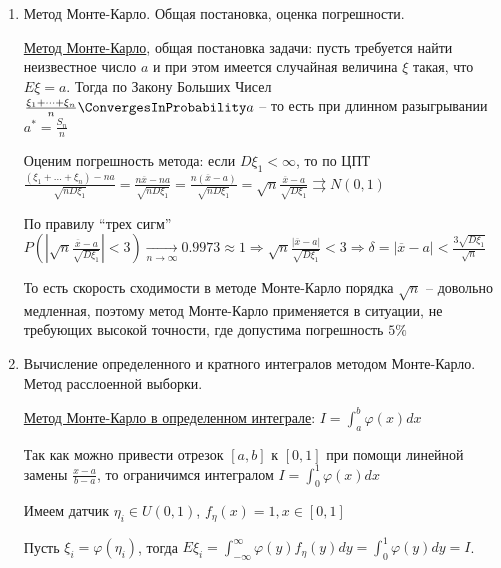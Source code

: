 \begin{enumerate}
\begin{enumerate}[label*=\Roman*. ]
\begin{MyTheorem}
            Тогда $N \in \Pi_\lambda$
        \end{MyTheorem}

        Алгоритм: проводим серию $k$-ую серию испытаний до тех пор, пока $\prod^k_{i = 1} y_i < e^{-\lambda}$, тогда $\xi_i = k$

    \end{enumerate}


    \item Метод Монте-Карло. Общая постановка, оценка погрешности.

    \hyperlink{monte_carlo}{Метод Монте-Карло}, общая постановка задачи: пусть требуется найти неизвестное число $a$ и при этом имеется случайная величина $\xi$ такая, что $E \xi = a$. Тогда по Закону Больших Чисел $\frac{\xi_1 + \dots + \xi_n}{n} \ConvergesInProbability a$ -- то есть при длинном разыгрывании $a^* = \frac{S_n}{n}$

    Оценим погрешность метода: если $D\xi_1 < \infty$, то по ЦПТ $\frac{(\xi_1 + \dots + \xi_n) - n a}{\sqrt{n D \xi_1}} = \frac{n \overline{x} - na}{\sqrt{n D\xi_1}} = \frac{n(\overline{x} - a)}{\sqrt{n D\xi_1}} = \sqrt{n} \frac{\overline{x} - a}{\sqrt{D\xi_1}} \rightrightarrows N(0, 1)$

    По правилу \enquote{трех сигм} $P\left(\left|\sqrt{n} \frac{\overline{x} - a}{\sqrt{D\xi_1}}\right| < 3\right) \underset{n \to \infty}{\longrightarrow} 0.9973 \approx 1 \Longrightarrow \sqrt{n} \frac{|\overline{x} - a|}{\sqrt{D \xi_1}} < 3 \Longrightarrow \delta = |\overline{x} - a| < \frac{3\sqrt{D\xi_1}}{\sqrt{n}}$

    \Nota То есть скорость сходимости в методе Монте-Карло порядка $\sqrt{n}$ -- довольно медленная, поэтому метод Монте-Карло применяется в ситуации, не требующих высокой точности, где допустима погрешность $5\%$

    \item Вычисление определенного и кратного интегралов методом Монте-Карло. Метод расслоенной выборки.

    \hyperlink{monte_carlo_integral}{Метод Монте-Карло в определенном интеграле}: $I = \int_a^b \varphi(x) dx$

    Так как можно привести отрезок $[a, b]$ к $[0, 1]$ при помощи линейной замены $\frac{x - a}{b - a}$, то ограничимся интегралом $I = \int_0^1 \varphi(x) dx$

    Имеем датчик $\eta_i \in U(0, 1)$, $f_{\eta} (x) = 1, x \in [0, 1]$

    Пусть $\xi_i = \varphi(\eta_i)$, тогда $E\xi_i = \int_{-\infty}^{\infty} \varphi(y) f_\eta (y) dy = \int_0^1 \varphi(y) dy = I$. 
    

\end{enumerate}
